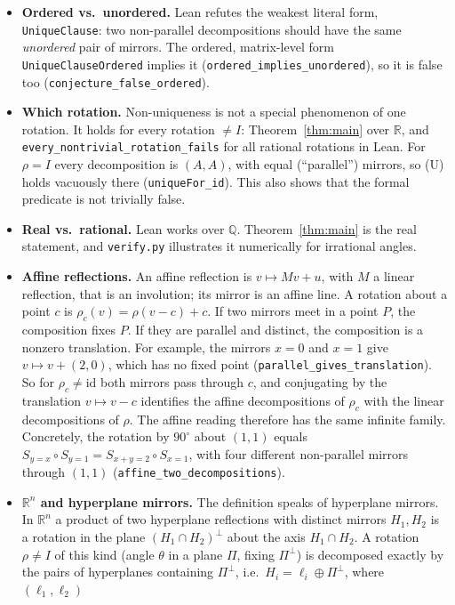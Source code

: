 \documentclass[11pt]{article}
\theoremstyle{definition}
\theoremstyle{remark}
\newcommand{\Q}{\mathbb Q}
\newcommand{\R}{\mathbb R}
\newcommand{\id}{\mathrm{id}}
\begin{document}
\begin{itemize}
\item \textbf{Ordered vs.\ unordered.} Lean refutes the weakest literal form, \texttt{UniqueClause}:
two non-parallel decompositions should have the same \emph{unordered} pair of mirrors. The
ordered, matrix-level form \texttt{UniqueClauseOrdered} implies it
(\texttt{ordered\_implies\_unordered}), so it is false too (\texttt{conjecture\_false\_ordered}).
\item \textbf{Which rotation.} Non-uniqueness is not a special phenomenon of one rotation. It
holds for every rotation $\neq I$: Theorem~\ref{thm:main} over $\R$, and
\texttt{every\_nontrivial\_rotation\_fails} for all rational rotations in Lean. For $\rho=I$
every decomposition is $(A,A)$, with equal (``parallel'') mirrors, so (U) holds vacuously there
(\texttt{uniqueFor\_id}). This also shows that the formal predicate is not trivially false.
\item \textbf{Real vs.\ rational.} Lean works over $\Q$. Theorem~\ref{thm:main} is the real
statement, and \texttt{verify.py} illustrates it numerically for irrational angles.
\item \textbf{Affine reflections.} An affine reflection is $v\mapsto Mv+u$, with $M$ a linear
reflection, that is an involution; its mirror is an affine line. A rotation about a point $c$
is $\rho_c(v)=\rho(v-c)+c$. If two mirrors meet in a point $P$, the composition fixes $P$. If
they are parallel and distinct, the composition is a nonzero translation. For example, the
mirrors $x=0$ and $x=1$ give $v\mapsto v+(2,0)$, which has no fixed point
(\texttt{parallel\_gives\_translation}). So for $\rho_c\neq\id$ both mirrors pass through $c$,
and conjugating by the translation $v\mapsto v-c$ identifies the affine decompositions of
$\rho_c$ with the linear decompositions of $\rho$. The affine reading therefore has the same
infinite family. Concretely, the rotation by $90^\circ$ about $(1,1)$ equals
$S_{y=x}\circ S_{y=1}=S_{x+y=2}\circ S_{x=1}$, with four different non-parallel mirrors through
$(1,1)$ (\texttt{affine\_two\_decompositions}).
\item \textbf{$\R^n$ and hyperplane mirrors.} The definition speaks of hyperplane mirrors. In
$\R^n$ a product of two hyperplane reflections with distinct mirrors $H_1,H_2$ is a rotation in
the plane $(H_1\cap H_2)^\perp$ about the axis $H_1\cap H_2$. A rotation $\rho\neq I$ of this
kind (angle $\theta$ in a plane $\Pi$, fixing $\Pi^\perp$) is decomposed exactly by the pairs of
hyperplanes containing $\Pi^\perp$, i.e.\ $H_i=\ell_i\oplus\Pi^\perp$, where $(\ell_1,\ell_2)$

\end{itemize}
\end{document}
